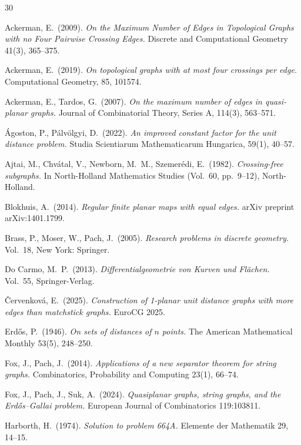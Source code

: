 \documentclass[a4paper,10pt]{article}
\begin{document}
\small
\begin{thebibliography}{30} 


 Ackerman, E.\ (2009).
{\it On the Maximum Number of Edges in Topological Graphs with no Four Pairwise Crossing Edges.}
Discrete and Computational Geometry 41(3), 365--375.

Ackerman, E.\ (2019).
{\it On topological graphs with at most four crossings per edge.}
Computational Geometry, 85, 101574.

 Ackerman, E., Tardos, G.\ (2007).
{\it On the maximum number of edges in quasi-planar graphs.}
Journal of Combinatorial Theory, Series A, 114(3), 563--571.

\'Agoston, P., P\'alv\"olgyi, D.\ (2022).
{\it An improved constant factor for the unit distance problem.}
Studia Scientiarum Mathematicarum Hungarica, 59(1), 40--57.


Ajtai, M., Chv\'atal, V., Newborn, M.\ M., Szemer\'edi, E.\ (1982).
{\it Crossing-free subgraphs.}
In North-Holland Mathematics Studies (Vol.\ 60, pp.\ 9--12), North-Holland.

Blokhuis, A.\ (2014).
{\it Regular finite planar maps with equal edges.}
arXiv preprint arXiv:1401.1799.

Brass, P., Moser, W., Pach, J.\ (2005).
{\it Research problems in discrete geometry.}
Vol.\ 18, New York: Springer.


Do Carmo, M.\ P.\ (2013).
{\it Differentialgeometrie von Kurven und Fl\"achen.}
Vol.\ 55, Springer-Verlag.


\v{C}ervenkov\'a, E.\ (2025).
{\it Construction of 1-planar unit distance graphs with more edges than matchstick graphs.}
EuroCG 2025.

Erd\H{o}s, P.\ (1946).
{\it On sets of distances of $n$ points.}
The American Mathematical Monthly 53(5), 248--250.


Fox, J., Pach, J.\ (2014).
{\it Applications of a new separator theorem for string graphs.} 
Combinatorics, Probability and Computing 23(1), 66--74.

Fox, J., Pach, J., Suk, A.\ (2024).
{\it Quasiplanar graphs, string graphs, and the Erd\H{o}s–Gallai problem.}
European Journal of Combinatorics 119:103811.


Harborth, H.\ (1974).
{\it Solution to problem 664A.}
Elemente der Mathematik 29, 14--15.


\end{thebibliography}
\end{document}
